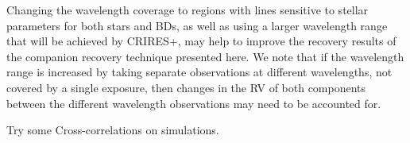 Changing the wavelength coverage to regions with lines sensitive to stellar parameters for both stars and BDs, as well as using a larger wavelength range that will be achieved by CRIRES+, may help to improve the recovery results of the companion recovery technique presented here. We note that if the wavelength range is increased by taking separate observations at different wavelengths, not covered by a single exposure, then changes in the RV of both components between the different wavelength observations may need to be accounted for.







Try some Cross-correlations on simulations.


